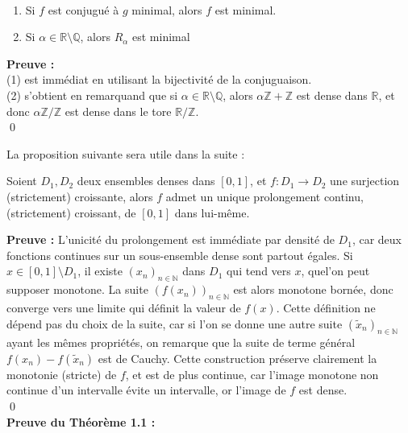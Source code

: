 \documentclass[11pt,a4paper]{article}
\begin{document}
\begin{proposition} ~ 
\begin{enumerate}
\item Si $f$ est conjugué à $g$ minimal, alors $f$ est minimal.
\item Si $\alpha \in \mathbb{R} \setminus \mathbb{Q}$, alors $R_\alpha$ est minimal
\end{enumerate}
\end{proposition}

\textbf{Preuve :} \\ 
(1) est immédiat en utilisant la bijectivité de la conjuguaison. \\
(2) s'obtient en remarquand que si $\alpha \in \mathbb{R} \setminus \mathbb{Q}$, alors $\alpha\mathbb{Z} + \mathbb{Z}$ est dense dans $\mathbb{R}$, et donc $\alpha\mathbb{Z}/\mathbb{Z}$ est dense dans le tore $\mathbb{R}/\mathbb{Z}$. \\ \qed

La proposition suivante sera utile dans la suite :

\begin{proposition}
Soient $D_1,D_2$ deux ensembles denses dans $[0,1]$, et $f : D_1 \to D_2$ une surjection (strictement) croissante, alors $f$ admet un unique prolongement continu, (strictement) croissant, de $[0,1]$ dans lui-même.
\end{proposition}

\textbf{Preuve :} L'unicité du prolongement est immédiate par densité de $D_1$, car deux fonctions continues sur un sous-ensemble dense sont partout égales. Si $x\in [0,1]\setminus D_1$, il existe $(x_n)_{n\in \mathbb{N}}$ dans $D_1$ qui tend vers $x$, quel'on peut supposer monotone. La suite $(f(x_n))_{n\in\mathbb{N}}$ est alors monotone bornée, donc converge vers une limite qui définit la valeur de $f(x)$. Cette définition ne dépend pas du choix de la suite, car si l'on se donne une autre suite $(\tilde{x}_n)_{n\in\mathbb{N}}$ ayant les mêmes propriétés, on remarque que la suite de terme général $f(x_n)-f(\tilde{x}_n)$ est de Cauchy. Cette construction préserve clairement la monotonie (stricte) de $f$, et est de plus continue, car l'image monotone non continue d'un intervalle évite un intervalle, or l'image de $f$ est dense. \\ \qed
\\

\textbf{Preuve du Théorème 1.1 :} \\
\end{document}

